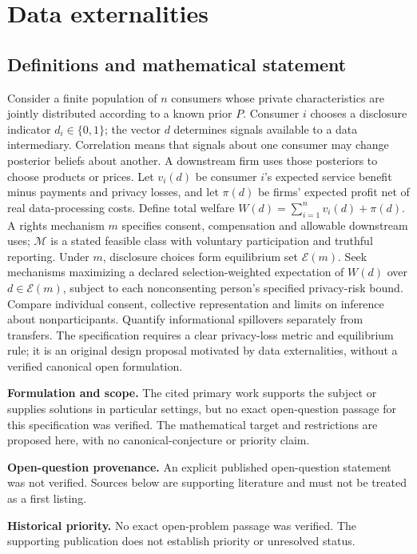 \documentclass[11pt]{article}
\begin{document}
\section*{Data externalities}\label{30007689}
\subsection{Definitions and mathematical statement}
Consider a finite population of \(n\) consumers whose private characteristics are jointly distributed according to a known prior \(P\). Consumer \(i\) chooses a disclosure indicator \(d_i\in\{0,1\}\); the vector \(d\) determines signals available to a data intermediary. Correlation means that signals about one consumer may change posterior beliefs about another. A downstream firm uses those posteriors to choose products or prices. Let \(v_i(d)\) be consumer \(i\)'s expected service benefit minus payments and privacy losses, and let \(\pi(d)\) be firms' expected profit net of real data-processing costs. Define total welfare \(W(d)=\sum_{i=1}^n v_i(d)+\pi(d)\). A rights mechanism \(m\) specifies consent, compensation and allowable downstream uses; \(\mathcal M\) is a stated feasible class with voluntary participation and truthful reporting. Under \(m\), disclosure choices form equilibrium set \(\mathcal E(m)\). Seek mechanisms maximizing a declared selection-weighted expectation of \(W(d)\) over \(d\in\mathcal E(m)\), subject to each nonconsenting person's specified privacy-risk bound. Compare individual consent, collective representation and limits on inference about nonparticipants. Quantify informational spillovers separately from transfers. The specification requires a clear privacy-loss metric and equilibrium rule; it is an original design proposal motivated by data externalities, without a verified canonical open formulation.

\par\textbf{Formulation and scope.} The cited primary work supports the subject or supplies solutions in particular settings, but no exact open-question passage for this specification was verified. The mathematical target and restrictions are proposed here, with no canonical-conjecture or priority claim.

\par\textbf{Open-question provenance.} An explicit published open-question statement was not verified. Sources below are supporting literature and must not be treated as a first listing.

\par\textbf{Historical priority.} No exact open-problem passage was verified. The supporting publication does not establish priority or unresolved status.
\end{document}
